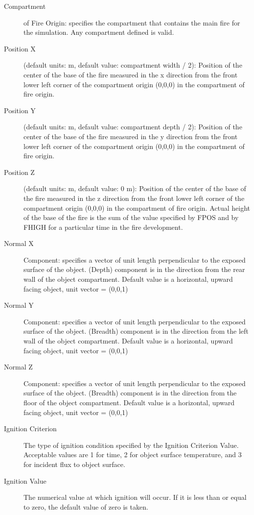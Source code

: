 \begin{description}
\item[Compartment] of Fire Origin: specifies the compartment that contains the main fire for the simulation.  Any compartment defined is valid.

\item[Position X] (default units: m, default value: compartment width / 2): Position of the center of the base of the fire measured in the x direction from the front lower left corner of the compartment origin (0,0,0) in the compartment of fire origin.

\item[Position Y] (default units: m, default value: compartment depth / 2): Position of the center of the base of the fire measured in the y direction from the front lower left corner of the compartment origin (0,0,0) in the compartment of fire origin.

\item[Position Z] (default units: m, default value: 0 m): Position of the center of the base of the fire measured in the z direction from the front lower left corner of the compartment origin (0,0,0) in the compartment of fire origin. Actual height of the base of the fire is the sum of the value specified by FPOS and by FHIGH for a particular time in the fire development.

\item[Normal  X] Component: specifies a vector of unit length perpendicular to the exposed surface of the object. (Depth) component is in the direction from the rear wall of the object compartment. Default value is a horizontal, upward facing object, unit vector = (0,0,1)

\item[Normal  Y] Component: specifies a vector of unit length perpendicular to the exposed surface of the object. (Breadth) component is in the direction from the left wall of the object compartment. Default value is a horizontal, upward facing object, unit vector = (0,0,1)

\item[Normal  Z] Component: specifies a vector of unit length perpendicular to the exposed surface of the object. (Breadth) component is in the direction from the floor of the object compartment. Default value is a horizontal, upward facing object, unit vector = (0,0,1)

\item[Ignition Criterion] The type of ignition condition specified by the Ignition Criterion Value. Acceptable values are 1 for time, 2 for object surface temperature, and 3 for incident flux to object surface.

\item[Ignition Value] The numerical value at which ignition will occur. If it is less than or equal to zero, the default value of zero is taken.
\end{description}


